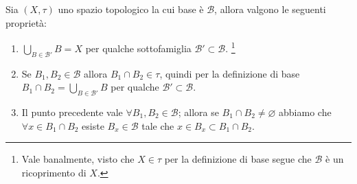\begin{remark}
	Sia $(X, \tau)$ uno spazio topologico la cui base è $\mathcal{B}$, allora valgono le seguenti proprietà:
	\begin{enumerate}
		\item $\bigcup_{B \in \mathcal{B}'} B = X$ per qualche sottofamiglia $\mathcal{B}' \subset \mathcal{B}$. 
		\footnote{Vale banalmente, visto che $X \in \tau$ per la definizione di base segue che $\mathcal{B}$ è un ricoprimento di $X$.}
		\item Se $B_1, B_2 \in \mathcal{B}$ allora $B_1 \cap B_2 \in \tau$, quindi per la definizione di base $B_1 \cap B_2  = \bigcup_{B \in \mathcal{B}'} B$ per qualche $\mathcal{B}' \subset \mathcal{B}$.
		\item Il punto precedente vale $\forall B_1, B_2 \in \mathcal{B}$; allora se $B_1 \cap B_2 \neq \varnothing$ abbiamo che $\forall x \in B_1 \cap B_2$ esiste $B_x \in \mathcal{B}$ tale che $x \in B_x \subset B_1 \cap B_2$.
	\end{enumerate}
\end{remark}

